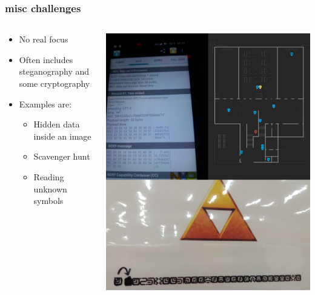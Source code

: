 \documentclass[aspectratio=169]{beamer}
\begin{document}
\begin{frame}
    \frametitle{misc challenges}
    \begin{columns}
        \begin{column}{0.5\textwidth}
            \begin{itemize}
                \item No real focus
                \item Often includes steganography and some cryptography
                \item Examples are:
                \begin{itemize}
                    \item Hidden data inside an image
                    \item Scavenger hunt
                    \item Reading unknown symbols
                \end{itemize}
            \end{itemize}
        \end{column}
        \begin{column}{0.5\textwidth}
            \includegraphics[width=\textwidth]{misc_example.jpg}
        \end{column}
    \end{columns}
\end{frame}
\end{document}
